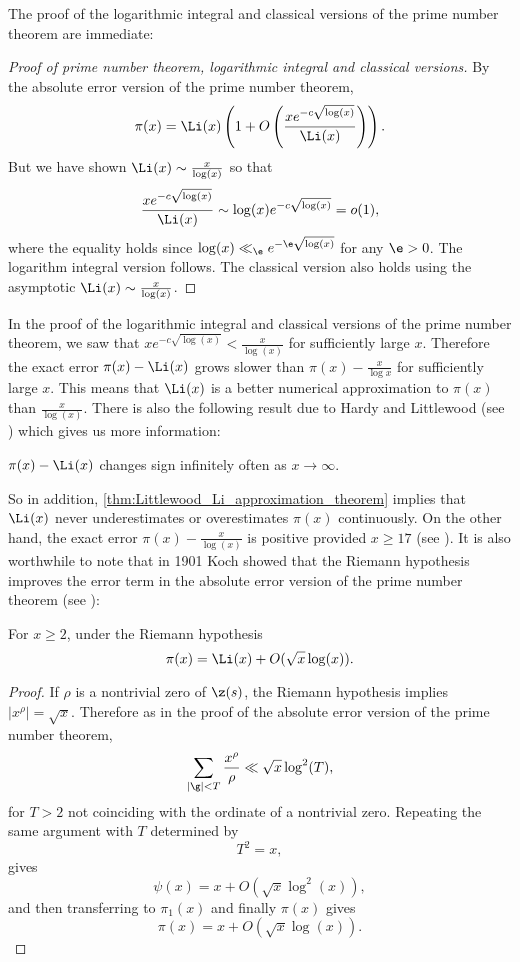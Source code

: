       The proof of the logarithmic integral and classical versions of the prime number theorem are immediate:

      \begin{proof}[Proof of prime number theorem, logarithmic integral and classical versions]
        By the absolute error version of the prime number theorem,
        \[
          \pi(x) = \Li(x)\left(1+O\left(\frac{xe^{-c\sqrt{\log(x)}}}{\Li(x)}\right)\right).
        \]
        But we have shown $\Li(x) \sim \frac{x}{\log(x)}$ so that
        \[
          \frac{xe^{-c\sqrt{\log(x)}}}{\Li(x)} \sim \log(x)e^{-c\sqrt{\log(x)}} = o(1),
        \]
        where the equality holds since $\log(x) \ll_{\e} e^{-\e\sqrt{\log(x)}}$ for any $\e > 0$. The logarithm integral version follows. The classical version also holds using the asymptotic $\Li(x) \sim \frac{x}{\log(x)}$.
      \end{proof}
      
      In the proof of the logarithmic integral and classical versions of the prime number theorem, we saw that $xe^{-c\sqrt{\log(x)}} < \frac{x}{\log(x)}$ for sufficiently large $x$. Therefore the exact error $\pi(x)-\Li(x)$ grows slower than $\pi(x)-\frac{x}{\log{x}}$ for sufficiently large $x$. This means that $\Li(x)$ is a better numerical approximation to $\pi(x)$ than $\frac{x}{\log(x)}$. There is also the following result due to Hardy and Littlewood (see \cite{hardy1916contributions}) which gives us more information:

      \begin{proposition}\label{thm:Littlewood_Li_approximation_theorem}
        $\pi(x)-\Li(x)$ changes sign infinitely often as $x \to \infty$.
      \end{proposition}

      So in addition, \cref{thm:Littlewood_Li_approximation_theorem} implies that $\Li(x)$ never underestimates or overestimates $\pi(x)$ continuously. On the other hand, the exact error $\pi(x)-\frac{x}{\log(x)}$ is positive provided $x \ge 17$ (see \cite{rosser1962approximate}). It is also worthwhile to note that in 1901 Koch showed that the Riemann hypothesis improves the error term in the absolute error version of the prime number theorem (see \cite{von1901distribution}):

      \begin{proposition}
        For $x \ge 2$, under the Riemann hypothesis
        \[
          \pi(x) = \Li(x)+O(\sqrt{x}\log(x)).
        \]
      \end{proposition}
      \begin{proof}
        If $\rho$ is a nontrivial zero of $\z(s)$, the Riemann hypothesis implies $|x^{\rho}| = \sqrt{x}$. Therefore as in the proof of the absolute error version of the prime number theorem,
        \[
          \sum_{|\g| < T}\frac{x^{\rho}}{\rho} \ll \sqrt{x}\log^{2}(T),
        \]
        for $T > 2$ not coinciding with the ordinate of a nontrivial zero. Repeating the same argument with $T$ determined by
        \[
          T^{2} = x,
        \]
        gives
        \[
          \psi(x) = x+O(\sqrt{x}\log^{2}(x)),
        \]
        and then transferring to $\pi_{1}(x)$ and finally $\pi(x)$ gives
        \[
          \pi(x) = x+O(\sqrt{x}\log(x)).
        \]
      \end{proof}
